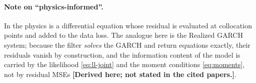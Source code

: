 \documentclass[11pt]{article}
\newcommand{\derived}{\textbf{[Derived here; not stated in the cited papers.]}}
\begin{document}
\paragraph{Note on ``physics-informed''.} In \cite{Raissi2019} the physics is a differential
equation whose residual is evaluated at collocation points and added to the data loss. The
analogue here is the Realized GARCH system; because the filter \emph{solves} the GARCH and
return equations exactly, their residuals vanish by construction, and the information
content of the model is carried by the likelihood \eqref{eq:ll-joint} and the moment
conditions \eqref{eq:moments}, not by residual MSEs \derived.
\end{document}
